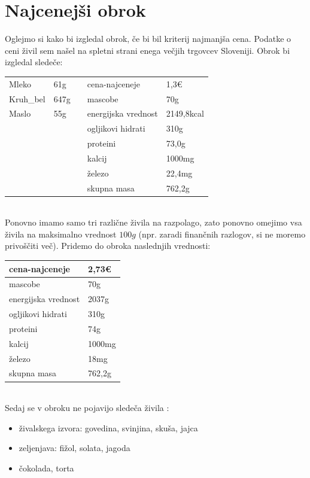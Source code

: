 \documentclass[slovene,11pt,a4paper]{article}
\numberwithin{equation}{section} %
\numberwithin{figure}{section} %
\numberwithin{table}{section} %
\begin{document}
\section{Najcenejši obrok}
Oglejmo si kako bi izgledal obrok, če bi bil kriterij najmanjša cena. Podatke o ceni živil sem našel na spletni strani enega večjih trgovcev Sloveniji. Obrok bi izgledal sledeče:
\begin{table}[!h]
\centering
\begin{tabular}{lll|l|l|}
\cline{1-2} \cline{4-5}
\multicolumn{1}{|l|}{Mleko}     & \multicolumn{1}{l|}{61g}  &  & cena-najceneje      & 1,3\euro      \\ \cline{1-2} \cline{4-5} 
\multicolumn{1}{|l|}{Kruh\_bel} & \multicolumn{1}{l|}{647g} &  & mascobe             & 70g        \\ \cline{1-2} \cline{4-5} 
\multicolumn{1}{|l|}{Maslo}     & \multicolumn{1}{l|}{55g}  &  & energijska vrednost & 2149,8kcal \\ \cline{1-2} \cline{4-5} 
                                &                           &  & ogljikovi hidrati   & 310g       \\ \cline{4-5} 
                                &                           &  & proteini            & 73,0g      \\ \cline{4-5} 
                                &                           &  & kalcij              & 1000mg     \\ \cline{4-5} 
                                &                           &  & železo              & 22,4mg     \\ \cline{4-5} 
                                &                           &  & skupna masa         & 762,2g     \\ \cline{4-5} 
\end{tabular}
\end{table}
\\
Ponovno imamo samo tri različne živila na razpolago, zato ponovno omejimo vsa živila na maksimalno vrednost $100g$ (npr. zaradi finančnih razlogov, si ne moremo privoščiti več). Pridemo do obroka naslednjih vrednosti:
\begin{table}[!h]
\centering
\begin{tabular}{|l|l|}
\hline
cena-najceneje      & 2,73\euro \\ \hline
mascobe             & 70g       \\ \hline
energijska vrednost & 2037g     \\ \hline
ogljikovi hidrati   & 310g      \\ \hline
proteini            & 74g       \\ \hline
kalcij              & 1000mg    \\ \hline
železo              & 18mg      \\ \hline
skupna masa         & 762,2g    \\ \hline
\end{tabular}
\end{table}
\\
Sedaj se v obroku ne pojavijo sledeča živila :
\begin{itemize}
\item živalskega izvora: govedina, svinjina, skuša, jajca
\item zeljenjava: fižol, solata, jagoda
\item čokolada, torta
\end{itemize}

\pagebreak
\end{document}
